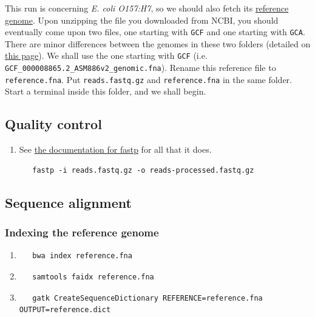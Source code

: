 \documentclass[12pt,letterpaper]{article}
\begin{document}
This run is concerning \textit{E. coli O157:H7}, so we should also fetch its \href{https://www.ncbi.nlm.nih.gov/datasets/taxonomy/83334/}{reference genome}. Upon unzipping the file you downloaded from NCBI, you should eventually come upon two files, one starting with \texttt{GCF} and one starting with \texttt{GCA}. There are minor differences between the genomes in these two folders (detailed on \href{https://www.ncbi.nlm.nih.gov/assembly/model/}{this page}). We shall use the one starting with \texttt{GCF} (i.e. \texttt{GCF\_000008865.2\_ASM886v2\_genomic.fna}). Rename this reference file to \texttt{reference.fna}. Put \texttt{reads.fastq.gz} and \texttt{reference.fna} in the same folder. Start a terminal inside this folder, and we shall begin.

\subsection{Quality control}

\begin{enumerate}
   \item See \href{https://github.com/OpenGene/fastp}{the documentation for fastp} for all that it does. \begin{verbatim}
   fastp -i reads.fastq.gz -o reads-processed.fastq.gz
   \end{verbatim}
\end{enumerate}

\subsection{Sequence alignment}

\subsubsection{Indexing the reference genome}

\begin{enumerate}
   \item \begin{verbatim}
   bwa index reference.fna
   \end{verbatim}
   \item \begin{verbatim}
   samtools faidx reference.fna
   \end{verbatim}
   \item \begin{verbatim}
   gatk CreateSequenceDictionary REFERENCE=reference.fna OUTPUT=reference.dict
   \end{verbatim}
\end{enumerate}
\end{document}

